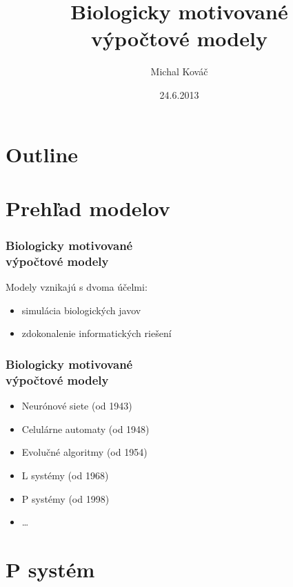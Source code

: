\documentclass{beamer}
\title{Biologicky motivované\\výpočtové modely}
\author{Michal Kováč}
\institute{FMFI UK}
\date{24.6.2013}
\begin{document}
\begin{frame}[t]
\titlepage
\end{frame}

\section*{Outline}
\begin{frame}
\tableofcontents
\end{frame}

\section{Prehľad modelov} %
\label{sec:prehlad_modelov}

\begin{frame}[t]\frametitle{Biologicky motivované\\výpočtové modely}
Modely vznikajú s dvoma účelmi:
\begin{itemize}
  \item simulácia biologických javov
  \item zdokonalenie informatických riešení
\end{itemize}
\end{frame}

\begin{frame}[t]\frametitle{Biologicky motivované\\výpočtové modely}
\begin{itemize}
  \item Neurónové siete (od 1943)
  \item Celulárne automaty (od 1948)
  \item Evolučné algoritmy (od 1954)
  \item L systémy (od 1968)
  \item P systémy (od 1998) \cite{Paun98}
  \item \dots

\end{itemize}
\end{frame}


\section{P systém} %
\label{sec:membranov_systemy}
\end{document}
